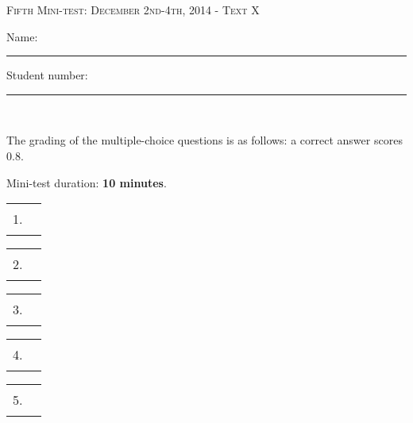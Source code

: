 \documentclass{docist}
\begin{document}
\thispagestyle{empty}

\begin{center}
  {\Large \textsc{Fifth Mini-test: December 2nd-4th, 2014 - Text X\\[2ex]}}
  {\normalsize    Name: \rule{8cm}{1pt} Student number: \rule{2cm}{1pt}\\[2ex]}
\end{center}

The grading of the multiple-choice questions is as follows: a correct answer scores 0.8.


Mini-test duration: \textbf{10 minutes}. 

\begin{center}
%
  \begin{tabular}{rc}
    1. & \rule{1cm}{1pt} \\[2ex]
  \end{tabular}
  \hspace*{0.7cm}
  \begin{tabular}{rc}
    2. & \rule{1cm}{1pt} \\[2ex]
  \end{tabular}
  \hspace*{0.7cm}
  \begin{tabular}{rc}
    3. & \rule{1cm}{1pt} \\[2ex]
  \end{tabular}
  \hspace*{0.7cm}
  \begin{tabular}{rc}
    4. & \rule{1cm}{1pt} \\[2ex]
  \end{tabular}
  \hspace*{0.7cm}
  \begin{tabular}{rc}
    5. & \rule{1cm}{1pt} \\[2ex]
  \end{tabular}
\end{center}





\qPeerToPeerSpace

\qPeerToPeerDynamicReconfiguration

\qTiers

\qPublishSubscribe
\end{document}
